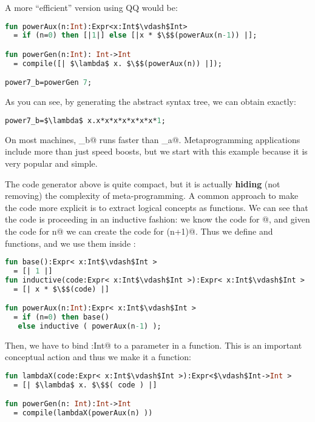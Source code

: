 \noindent A more ``efficient'' version using QQ would be:

\begin{lstlisting}[language=ML]
fun powerAux(n:Int):Expr<x:Int$\vdash$Int> 
  = if (n=0) then [|1|] else [|x * $\$$(powerAux(n-1)) |];

fun powerGen(n:Int): Int->Int
  = compile([| $\lambda$ x. $\$$(powerAux(n)) |]);

power7_b=powerGen 7;
\end{lstlisting}

\noindent As you can see, by generating the abstract syntax tree, we can obtain exactly:

\begin{lstlisting}[language=ML]
power7_b=$\lambda$ x.x*x*x*x*x*x*x*1;
\end{lstlisting}

\noindent On most machines, _b@ runs faster than _a@.
Metaprogramming applications include more than just speed boosts, but we start with this example because it is very popular and simple.

The code generator above is quite compact, but it is actually \textbf{hiding} (not removing) the complexity of meta-programming.
A common approach to make the code more explicit is to extract
logical concepts as functions.
We can see that the code is proceeding in an inductive fashion:
we know the code for @, and given the code for
\Q@pow n@  we can create the code for \Q@pow (n+1)@.
Thus we define \Q@base@ and \Q@inductive@ functions, and we
use them inside \Q@powerAux@:

\begin{lstlisting}[language=ML]
fun base():Expr< x:Int$\vdash$Int > 
  = [| 1 |]
fun inductive(code:Expr< x:Int$\vdash$Int >):Expr< x:Int$\vdash$Int >
  = [| x * $\$$(code) |]

fun powerAux(n:Int):Expr< x:Int$\vdash$Int >
  = if (n=0) then base()
   else inductive ( powerAux(n-1) );
\end{lstlisting}

\noindent Then, we have to bind \Q@x:Int@ to a parameter in a function.
This is an important conceptual action and thus we make it a function:

\begin{lstlisting}[language=ML]
fun lambdaX(code:Expr< x:Int$\vdash$Int >):Expr<$\vdash$Int->Int > 
  = [| $\lambda$ x. $\$$( code ) |]

fun powerGen(n: Int):Int->Int
  = compile(lambdaX(powerAux(n) ))
\end{lstlisting}

